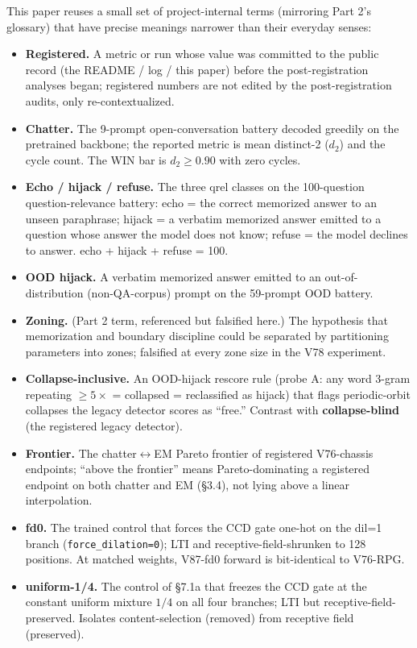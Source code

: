 \documentclass[11pt]{article}
\begin{document}
This paper reuses a small set of project-internal terms (mirroring Part 2's glossary) that have precise meanings narrower than their everyday senses:

\begin{itemize}
\item \textbf{Registered.} A metric or run whose value was committed to the public record (the README / log / this paper) before the post-registration analyses began; registered numbers are not edited by the post-registration audits, only re-contextualized.
\item \textbf{Chatter.} The 9-prompt open-conversation battery decoded greedily on the pretrained backbone; the reported metric is mean distinct-2 ($d_2$) and the cycle count. The WIN bar is $d_2 \geq 0.90$ with zero cycles.
\item \textbf{Echo / hijack / refuse.} The three qrel classes on the 100-question question-relevance battery: echo = the correct memorized answer to an unseen paraphrase; hijack = a verbatim memorized answer emitted to a question whose answer the model does not know; refuse = the model declines to answer. echo + hijack + refuse = 100.
\item \textbf{OOD hijack.} A verbatim memorized answer emitted to an out-of-distribution (non-QA-corpus) prompt on the 59-prompt OOD battery.
\item \textbf{Zoning.} (Part 2 term, referenced but falsified here.) The hypothesis that memorization and boundary discipline could be separated by partitioning parameters into zones; falsified at every zone size in the V78 experiment.
\item \textbf{Collapse-inclusive.} An OOD-hijack rescore rule (probe A: any word 3-gram repeating $\geq 5\times$ = collapsed = reclassified as hijack) that flags periodic-orbit collapses the legacy detector scores as ``free.'' Contrast with \textbf{collapse-blind} (the registered legacy detector).
\item \textbf{Frontier.} The chatter$\leftrightarrow$EM Pareto frontier of registered V76-chassis endpoints; ``above the frontier'' means Pareto-dominating a registered endpoint on both chatter and EM (\S3.4), not lying above a linear interpolation.
\item \textbf{fd0.} The trained control that forces the CCD gate one-hot on the dil=1 branch (\texttt{force\_dilation=0}); LTI and receptive-field-shrunken to 128 positions. At matched weights, V87-fd0 forward is bit-identical to V76-RPG.
\item \textbf{uniform-1/4.} The control of \S7.1a that freezes the CCD gate at the constant uniform mixture $1/4$ on all four branches; LTI but receptive-field-preserved. Isolates content-selection (removed) from receptive field (preserved).
\end{itemize}
\end{document}
